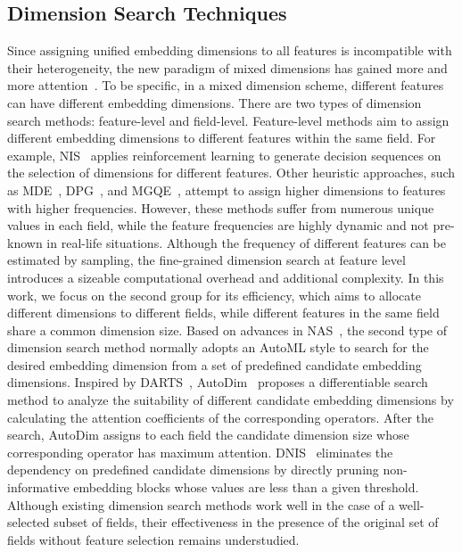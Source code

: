 \documentclass[10pt,journal,compsoc]{IEEEtran}
\begin{document}
\subsection{Dimension Search Techniques}
Since assigning unified embedding dimensions to all features is incompatible with their heterogeneity, the new paradigm of mixed dimensions has gained more and more attention~\cite{ginart2019mixed,zhao2020autoemb,cheng2020differentiable,joglekar2020neural}. 
To be specific, in a mixed dimension scheme, different features can have different embedding dimensions. 
 There are two types of dimension search methods:
feature-level and field-level. 
Feature-level methods aim to assign different embedding dimensions to different features within the same field. For example, NIS~\cite{joglekar2020neural} applies reinforcement learning to generate decision sequences on the selection of dimensions for different features. Other heuristic approaches, such as MDE~\cite{ginart2019mixed}, DPG~\cite{chen2020differentiable}, and MGQE~\cite{kang2020learning}, attempt to assign higher dimensions to features with higher frequencies. However, these methods suffer from numerous unique values in each field, while the feature frequencies are highly dynamic and not pre-known in real-life situations. Although the frequency of different features can be estimated by sampling, the fine-grained dimension search at feature level introduces a sizeable computational overhead and additional complexity. In this work, we focus on the second group for its efficiency, which aims to allocate different dimensions to different fields, while different features in the same field share a common dimension size. 
Based on advances in NAS~\cite{mei2019atomnas}, the second type of dimension search method normally adopts an AutoML style to search for the desired embedding dimension from a set of predefined candidate embedding dimensions. 
Inspired by DARTS~\cite{liang2019darts+,liu2018darts}, AutoDim~\cite{zhao2020memory} proposes a differentiable search method to analyze the suitability of different candidate embedding dimensions by calculating the attention coefficients of the corresponding operators. 
After the search, AutoDim assigns to each field the candidate dimension size whose corresponding operator has maximum attention.
DNIS~\cite{cheng2020differentiable} eliminates the dependency on predefined candidate dimensions by directly pruning non-informative embedding blocks whose values are less than a given threshold. 
Although existing dimension search methods work well in the case of a well-selected subset of fields, their effectiveness in the presence of the original set of fields without feature selection remains understudied.
\end{document}
